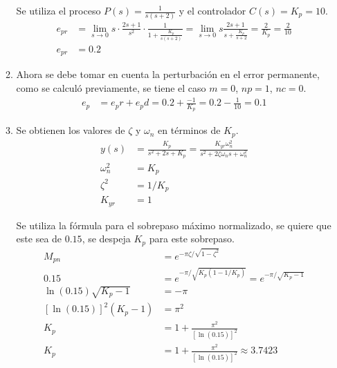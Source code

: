 \begin{ejercicio}
\begin{enumerate}
\begin{enumerate}
      Se utiliza el proceso $P(s)=\frac{1}{s(s+2)}$ y el controlador $C(s)=K_p=10$.
      \begin{align*}
        e_{pr} &= \lim_{s\rightarrow 0} s \cdot \frac{2s+1}{s^2} \cdot \frac{1}{1+\frac{K_p}{s(s+2)}}
        =
        \lim_{s\rightarrow 0} s\frac{2s+1}{s+\frac{K_p}{s+2}}
        = \frac{2}{K_p} = \frac{2}{10}
        \\
        e_{pr} &= 0.2
      \end{align*}

      \item %
      Ahora se debe tomar en cuenta la perturbación en el error permanente, como se calculó previamente, se tiene el caso $m=0$, $np=1$, $nc=0$.
      \begin{align*}
        e_p &= e_pr + e_pd = 0.2 + \frac{-1}{K_p} = 0.2 - \frac{1}{10} = 0.1
      \end{align*}

      \item %
      Se obtienen los valores de $\zeta$ y $\omega_n$ en términos de $K_p$.
      \begin{align*}
        y(s) &= \frac{K_p}{s^2+2s+K_p} = \frac{K_{yr}\omega_n^2}{s^2+ 2\zeta \omega_n s + \omega_n^2}
        \\
        \omega_n^2 &= K_p
        \\
        \zeta^2 &= 1/K_p
        \\
        K_{yr} &= 1
      \end{align*}

      Se utiliza la fórmula para el sobrepaso máximo normalizado, se quiere que este sea de $0.15$, se despeja $K_p$ para este sobrepaso.
      \begin{align*}
        M_{pn} &= e^{-\pi\zeta/\sqrt{1-\zeta^2}}
        \\
        0.15 &= e^{-\pi/\sqrt{K_p(1-1/K_p)}} = e^{-\pi/\sqrt{K_p-1}}
        \\
        \ln(0.15)\sqrt{K_p-1} &= -\pi
        \\
        [\ln(0.15)]^2 (K_p-1) &= \pi^2
        \\
        K_p &= 1 + \frac{\pi^2}{[\ln(0.15)]^2}
        \\
        K_p &= 1 + \frac{\pi^2}{[\ln(0.15)]^2} \approx 3.7423
      \end{align*}


\end{enumerate}
\end{enumerate}
\end{ejercicio}
